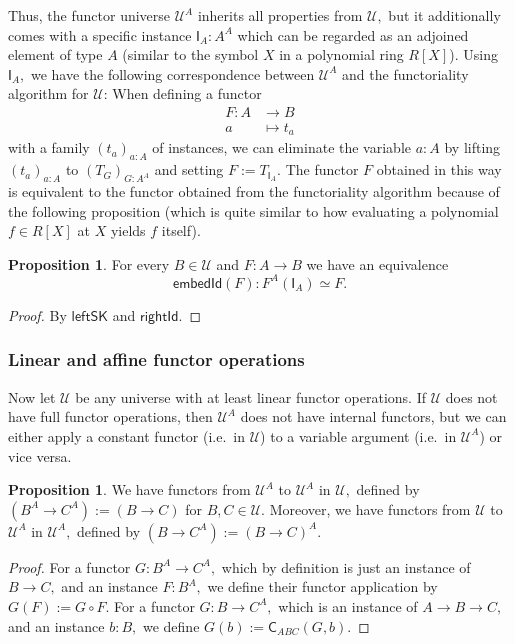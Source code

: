 \documentclass[a4paper]{article}
\theoremstyle{definition}
\newtheorem{proposition}[definition]{Proposition}
\theoremstyle{remark}
\renewcommand{\equiv}{\simeq}
\newcommand{\U}{\mathcal{U}}
\newcommand{\nm}{\mathsf}
\newcommand{\combinator}{\nm}
\newcommand{\idFun}{\combinator{I}}
\newcommand{\swapFun}{\combinator{C}}
\begin{document}
\vspace{1ex}
Thus, the functor universe $\U^A$ inherits all properties from $\U,$ but it
additionally comes with a specific instance $\idFun_A : A^A$ which can be
regarded as an adjoined element of type $A$ (similar to the symbol $X$ in a
polynomial ring $R[X]$). Using $\idFun_A,$ we have the following correspondence
between $\U^A$ and the functoriality algorithm for $\U$: When defining a functor
\begin{align*}
  F : A &\to     B\\
      a &\mapsto t_a
\end{align*}
with a family $(t_a)_{a : A}$ of instances, we can eliminate the variable
$a : A$ by lifting $(t_a)_{a : A}$ to $(T_G)_{G : A^A}$ and setting $F := T_{\idFun_A}.$
The functor $F$ obtained in this way is equivalent to the functor obtained from
the functoriality algorithm because of the following proposition (which is quite
similar to how evaluating a polynomial $f \in R[X]$ at $X$ yields $f$ itself).
\begin{proposition}
  For every $B \in \U$ and $F : A \to B$ we have an equivalence
  \[\nm{embedId}(F) : F^A(\idFun_A) \equiv F.\]
\end{proposition}
\vspace{-2ex}
\begin{proof}
  By $\nm{leftSK}$ and $\nm{rightId}.$
\end{proof}

\subsubsection*{Linear and affine functor operations}

Now let $\U$ be any universe with at least linear functor operations. If $\U$ does
not have full functor operations, then $\U^A$ does not have internal functors, but
we can either apply a constant functor (i.e.\ in $\U$) to a variable argument
(i.e.\ in $\U^A$) or vice versa.

\begin{proposition}
  \label{prp:fun-univ-linear}
  We have functors from $\U^A$ to $\U^A$ in $\U,$ defined by $(B^A \to C^A) := (B \to C)$
  for $B,C \in \U.$ Moreover, we have functors from $\U$ to $\U^A$ in $\U^A,$
  defined by $(B \to C^A) := (B \to C)^A.$
\end{proposition}
\vspace{-1ex}
\begin{proof}
  For a functor $G : B^A \to C^A,$ which by definition is just an instance of
  $B \to C,$ and an instance $F : B^A,$ we define their functor application by
  $G(F) := G \circ F.$ For a functor $G : B \to C^A,$ which is an instance of
  $A \to B \to C,$ and an instance $b : B,$ we define
  $G(b) := \swapFun_{ABC}(G,b).$
\end{proof}
\end{document}
